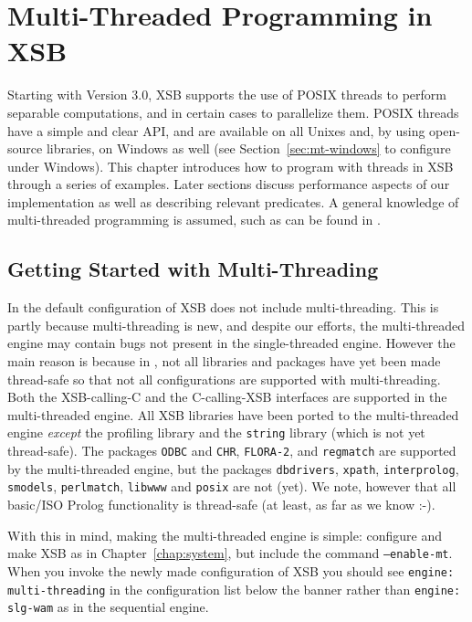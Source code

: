 \chapter{Multi-Threaded Programming in XSB} \label{chap:threads}

Starting with Version 3.0, XSB supports the use of POSIX threads to
perform separable computations, and in certain cases to parallelize
them.  POSIX threads have a simple and clear API, and are available on
all Unixes and, by using open-source libraries, on Windows as well
(see Section~\ref{sec:mt-windows} to configure under Windows).  This
chapter introduces how to program with threads in XSB through a series
of examples.  Later sections discuss performance aspects of our
implementation as well as describing relevant predicates.  A general
knowledge of multi-threaded programming is assumed, such as can be
found in \cite{LewB98,Bute97}.

\section{Getting Started with Multi-Threading}
%
In \version{} the default configuration of XSB does not include
multi-threading.  This is partly because multi-threading is new, and
despite our efforts, the multi-threaded engine may contain bugs not
present in the single-threaded engine.  However the main reason is
because in \version , not all libraries and packages have yet been
made thread-safe so that not all configurations are supported with
multi-threading.  Both the XSB-calling-C and the C-calling-XSB
interfaces are supported in the multi-threaded engine.  All XSB
libraries have been ported to the multi-threaded engine {\em except}
the profiling library and the {\tt string} library (which is not yet
thread-safe).  The packages {\tt ODBC} and {\tt CHR}, {\tt FLORA-2},
and {\tt regmatch} are supported by the multi-threaded engine, but the
packages {\tt dbdrivers}, {\tt xpath}, {\tt interprolog}, {\tt
  smodels}, {\tt perlmatch}, {\tt libwww} and {\tt posix} are not
(yet).  We note, however that all basic/ISO Prolog functionality is
thread-safe (at least, as far as we know :-).

With this in mind, making the multi-threaded engine is simple:
configure and make XSB as in Chapter~\ref{chap:system}, but include
the command {\tt --enable-mt}.  When you invoke the newly made
configuration of XSB you should see {\tt engine: multi-threading} in
the configuration list below the banner rather than {\tt engine:
  slg-wam} as in the sequential engine.

